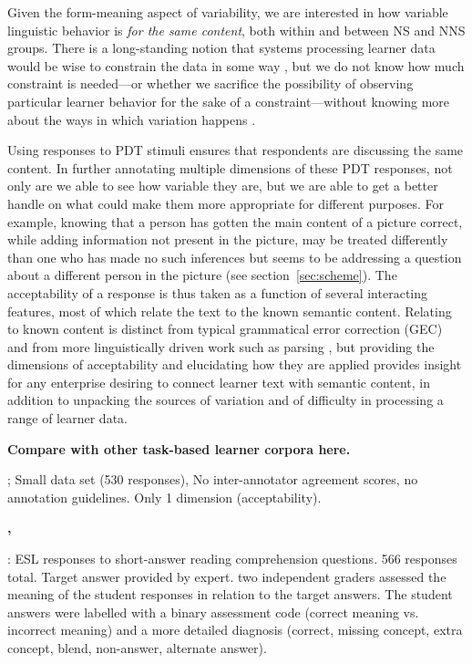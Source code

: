 \documentclass[11pt,a4paper]{article}
\begin{document}
Given the form-meaning aspect of variability, we are interested in how variable linguistic behavior is \emph{for the same content}, both within and between NS and NNS groups.  There is a long-standing notion that systems processing learner data would be wise to constrain the data in some way \citep[e.g.,][]{heift:schulze:07, somasundaran:chodorow:14, somasundaran:ea:15}, but we do not know how much constraint is needed---or whether we sacrifice the possibility of observing particular learner behavior for the sake of a constraint---without knowing more about the ways in which variation happens \citep[cf., in particular,][]{bailey:meurers:08}.  

Using responses to PDT stimuli ensures that respondents are discussing the same content.  In further annotating multiple dimensions of these PDT responses, not only are we able to see how variable they are, but we are able to get a better handle on what could make them more appropriate for different purposes.  For example, knowing that a person has gotten the main content of a picture correct, while adding information not present in the picture, may be treated differently than one who has made no such inferences but seems to be addressing a question about a different person in the picture (see section~\ref{sec:scheme}).  The acceptability of a response is thus taken as a function of several interacting features, most of which relate the text to the known semantic content.  Relating to known content is distinct from typical grammatical error correction (GEC) \citep{leacock:ea:14} and from more linguistically driven work such as parsing \citep[e.g.,][]{cahill-et-al:14, ragheb:dickinson:14a}, but providing the dimensions of acceptability and elucidating how they are applied provides insight for any enterprise desiring to connect learner text with semantic content, in addition to unpacking the sources of variation and of difficulty in processing a range of learner data.

\textbf{Compare with other task-based learner corpora here.}

\textbf{\citet{king:dickinson:13, king:dickinson:16}}; Small data set (530 responses), No inter-annotator agreement scores, no annotation guidelines. Only 1 dimension (acceptability).

\textbf{\citet{meurers2010compiling}, }

\textbf{\citet{meurers2011evaluating}}: ESL responses to short-answer reading comprehension questions. 566 responses total. Target answer provided by expert. two independent graders assessed the meaning of the student responses in relation to the target answers. The student answers were labelled with a binary assessment code (correct meaning vs. incorrect meaning) and a more detailed diagnosis (correct, missing concept, extra concept, blend, non-answer, alternate answer).
\end{document}

